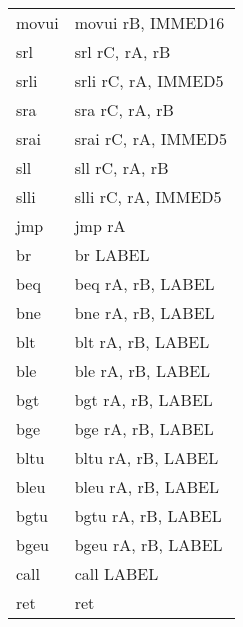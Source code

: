 \documentclass[10pt]{article}
\begin{document}
{\begin{tabular}{l|l}
  movui & movui rB, IMMED16\\
  srl & srl rC, rA, rB\\
  srli & srli rC, rA, IMMED5\\
  sra & sra rC, rA, rB\\
  srai & srai rC, rA, IMMED5\\
  sll & sll rC, rA, rB\\
  slli & slli rC, rA, IMMED5\\
  jmp & jmp rA\\
  br & br LABEL\\
  beq & beq rA, rB, LABEL\\
  bne & bne rA, rB, LABEL\\
  blt & blt rA, rB, LABEL\\
  ble & ble rA, rB, LABEL\\
  bgt & bgt rA, rB, LABEL\\
  bge & bge rA, rB, LABEL\\
  bltu & bltu rA, rB, LABEL\\
  bleu & bleu rA, rB, LABEL\\
  bgtu & bgtu rA, rB, LABEL\\
  bgeu & bgeu rA, rB, LABEL\\
  call & call LABEL\\
  ret & ret\\
\end{tabular}
}
\end{document}
